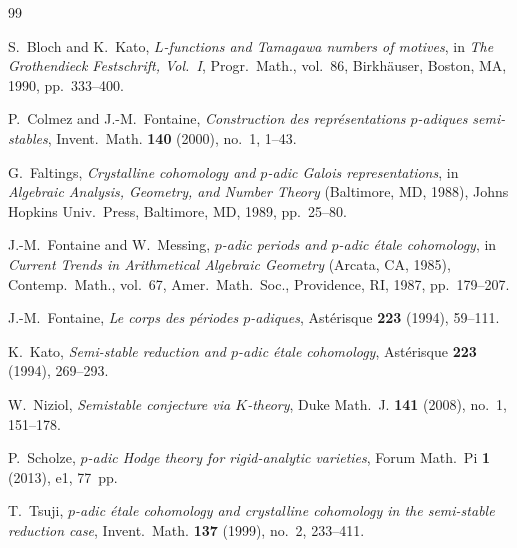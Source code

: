 \documentclass[10pt]{amsbook}
\theoremstyle{definition}
\theoremstyle{remark}
\begin{document}
\begin{thebibliography}{99}

S.~Bloch and K.~Kato, \emph{$L$-functions and Tamagawa numbers of motives}, in
\textit{The Grothendieck Festschrift, Vol.~I}, Progr.\ Math., vol.~86, Birkh\"auser, Boston,
MA, 1990, pp.~333--400.

P.~Colmez and J.-M.\ Fontaine, \emph{Construction des repr\'esentations $p$-adiques
semi-stables}, Invent.\ Math. \textbf{140} (2000), no.~1, 1--43.

G.~Faltings, \emph{Crystalline cohomology and $p$-adic Galois representations}, in
\textit{Algebraic Analysis, Geometry, and Number Theory} (Baltimore, MD, 1988), Johns Hopkins
Univ.\ Press, Baltimore, MD, 1989, pp.~25--80.

J.-M.\ Fontaine and W.~Messing, \emph{$p$-adic periods and $p$-adic \'etale cohomology}, in
\textit{Current Trends in Arithmetical Algebraic Geometry} (Arcata, CA, 1985), Contemp.\
Math., vol.~67, Amer.\ Math.\ Soc., Providence, RI, 1987, pp.~179--207.

J.-M.\ Fontaine, \emph{Le corps des p\'eriodes $p$-adiques}, Ast\'erisque \textbf{223}
(1994), 59--111.

K.~Kato, \emph{Semi-stable reduction and $p$-adic \'etale cohomology}, Ast\'erisque
\textbf{223} (1994), 269--293.

W.~Niziol, \emph{Semistable conjecture via $K$-theory}, Duke Math.\ J. \textbf{141} (2008),
no.~1, 151--178.

P.~Scholze, \emph{$p$-adic Hodge theory for rigid-analytic varieties}, Forum Math.\ Pi
\textbf{1} (2013), e1, 77~pp.

T.~Tsuji, \emph{$p$-adic \'etale cohomology and crystalline cohomology in the semi-stable
reduction case}, Invent.\ Math. \textbf{137} (1999), no.~2, 233--411.

\end{thebibliography}
\end{document}

